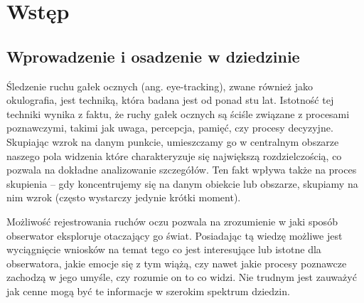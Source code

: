 \documentclass[a4paper,twoside,12pt]{book}
\newcounter{stronyPozaNumeracja}
\begin{document}
\tableofcontents

\setcounter{stronyPozaNumeracja}{\value{page}}
\mainmatter
\pagestyle{empty}

\cleardoublepage

\pagestyle{NumeryStronNazwyRozdzialow}


%
%
%
\chapter{Wstęp}
\label{ch:wstep}

\section{Wprowadzenie i osadzenie w dziedzinie}
\label{sec:wprowadzenie-i-osadzenie-w-dziedzinie}
Śledzenie ruchu gałek ocznych (ang. eye-tracking), zwane również jako okulografia, jest techniką, która badana jest od ponad stu lat. Istotność tej techniki wynika z faktu, że ruchy gałek ocznych są ściśle związane z procesami poznawczymi, takimi jak uwaga, percepcja, pamięć, czy procesy decyzyjne. Skupiając wzrok na danym punkcie, umieszczamy go w centralnym obszarze naszego pola widzenia które charakteryzuje się największą rozdzielczością, co pozwala na dokładne analizowanie szczegółów. Ten fakt wpływa także na proces skupienia -- gdy koncentrujemy się na danym obiekcie lub obszarze, skupiamy na nim wzrok (często wystarczy jedynie krótki moment).

Możliwość rejestrowania ruchów oczu pozwala na zrozumienie w jaki sposób obserwator eksploruje otaczający go świat. Posiadając tą wiedzę możliwe jest wyciągnięcie wniosków na temat tego co jest interesujące lub istotne dla obserwatora, jakie emocje się z tym wiążą, czy nawet jakie procesy poznawcze zachodzą w jego umyśle, czy rozumie on to co widzi. Nie trudnym jest zauważyć jak cenne mogą być te informacje w szerokim spektrum dziedzin.
\end{document}
